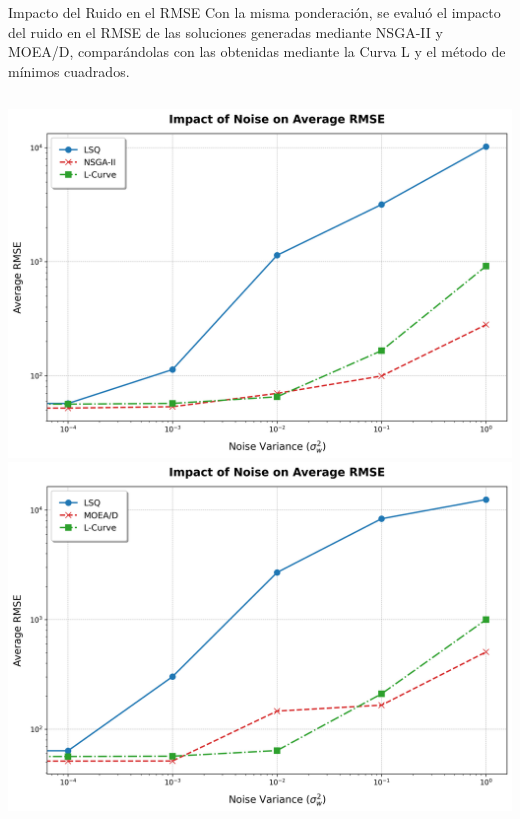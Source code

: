 \documentclass[aspectratio=169,xcolor=dvipsnames]{beamer}
\begin{document}
\begin{frame}{Impacto del Ruido en el RMSE}
    Con la misma ponderación, se evaluó el impacto del ruido en el RMSE de las soluciones generadas mediante NSGA-II y MOEA/D, comparándolas con las obtenidas mediante la Curva L y el método de mínimos cuadrados.
    
    \begin{columns}
        \centering
        \includegraphics[width=\textwidth]{img/impact_noise_on_rmse_nsga2.png} %
        \centering
        \includegraphics[width=\textwidth]{img/impact_noise_on_rmse_moead.png} %
    \end{columns}
\end{frame}
\end{document}
